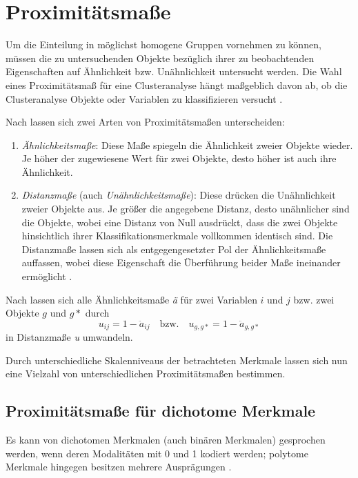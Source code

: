 \chapter{Proximitätsmaße}

Um die Einteilung in möglichst homogene Gruppen vornehmen zu können, müssen die zu untersuchenden Objekte bezüglich ihrer zu beobachtenden Eigenschaften auf Ähnlichkeit bzw. Unähnlichkeit untersucht werden. Die Wahl eines Proximitätsmaß für eine Clusteranalyse hängt maßgeblich davon ab, ob die Clusteranalyse Objekte oder Variablen zu klassifizieren versucht \citep[Vgl.][S. 196]{Bacher.2010}.

Nach \citet{Backhaus.2016} lassen sich zwei Arten von Proximitätsmaßen unterscheiden:

\begin{enumerate}
	\item \textit{Ähnlichkeitsmaße}: Diese Maße spiegeln die Ähnlichkeit zweier Objekte wieder. Je höher der zugewiesene Wert für zwei Objekte, desto höher ist auch ihre Ähnlichkeit.
	\item \textit{Distanzmaße} (auch \textit{Unähnlichkeitsmaße}): Diese drücken die Unähnlichkeit zweier Objekte aus. Je größer die angegebene Distanz, desto unähnlicher sind die Objekte, wobei eine Distanz von Null ausdrückt, dass die zwei Objekte hinsichtlich ihrer Klassifikationsmerkmale vollkommen identisch sind. Die Distanzmaße lassen sich als entgegengesetzter Pol der Ähnlichkeitsmaße auffassen, wobei diese Eigenschaft die Überführung beider Maße ineinander ermöglicht \citep[Vgl.][S. 205]{Eckey.2002}.
\end{enumerate}

Nach \citet[S. 200]{Bacher.2010} lassen sich alle Ähnlichkeitsmaße \textit{ä} für zwei Variablen $i$ und $j$ bzw. zwei Objekte $g$ und $g*$ durch 
\begin{equation}
u_{ij} = 1 - \ddot{a}_{ij} \quad \text{bzw.} \quad u_{g,g*} = 1- \ddot{a}_{g,g*}
\end{equation}
in Distanzmaße \textit{u} umwandeln.

Durch unterschiedliche Skalenniveaus der betrachteten Merkmale lassen sich nun eine Vielzahl von unterschiedlichen Proximitätsmaßen bestimmen.

\section{Proximitätsmaße für dichotome Merkmale}
Es kann von dichotomen Merkmalen (auch binären Merkmalen) gesprochen werden, wenn deren Modalitäten mit 0 und 1 kodiert werden; polytome Merkmale hingegen besitzen mehrere Ausprägungen \citep[Vgl.][S. 218]{Eckey.2002}. 

